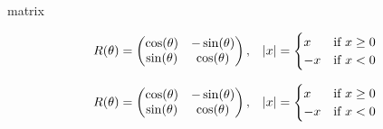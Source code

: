 \documentclass[presentatie.tex]{subfiles}
\begin{document}
\begin{saveblock}{matrix}
	\begin{highlightblock}[gobble=8,linewidth=\textwidth,framexleftmargin=0.25em]
		\begin{align*}
			R(\theta) = \begin{pmatrix}
				\cos(\theta) & -\sin(\theta)\\
				\sin(\theta) & \cos(\theta)
			\end{pmatrix},\quad
			\abs{x} = \begin{cases}
				x & \mbox{if $ x \geq 0$}\\
				-x & \mbox{if $ x < 0$}
			\end{cases}
		\end{align*}
	\end{highlightblock}
\end{saveblock}

\begin{frame}

	\begin{align*}
		R(\theta) = \begin{pmatrix}
			\cos(\theta) & -\sin(\theta)\\
			\sin(\theta) & \cos(\theta)
		\end{pmatrix},\quad
		\abs{x} = \begin{cases}
			x & \mbox{if $ x \geq 0$}\\
			-x & \mbox{if $ x < 0$}
		\end{cases}
	\end{align*}
\end{frame}

\end{document}

